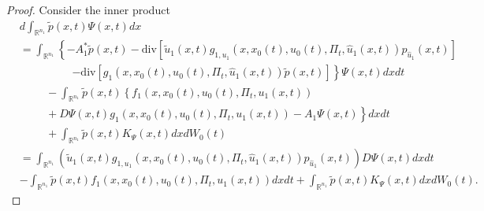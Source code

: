\documentclass[10pt,a4paper]{amsart}
\begin{document}
\begin{proof}
Consider the inner product
    \begin{align*}
        & d\int_{\mathbb{R}^{n_1}}\tilde{p}(x,t)\Psi(x,t)dx \\
        &= \int_{\mathbb{R}^{n_1}} \left\{-A_1^*\tilde{p}(x,t)-\mathrm{div}\left[\tilde{u}_1(x,t)g_{1,u_1}(x,x_0(t),u_0(t),\Pi_t,\hat{u}_1(x,t))p_{\hat{u}_1}(x,t)\right]\right.\\
        &\hspace{2cm} \left. -\mathrm{div}\left[g_1(x,x_0(t),u_0(t),\Pi_t,\hat{u}_1(x,t))\tilde{p}(x,t)\right] \right\}\Psi(x,t)dxdt\\
        &\hspace{1cm} -\int_{\mathbb{R}^{n_1}} \tilde{p}(x,t)\left\{ f_1(x, x_0(t), u_0(t), \Pi_t, u_1(x,t)) \right.\\
        &\hspace{1cm}+\left. D\Psi(x,t)g_1(x,x_0(t),u_0(t),\Pi_t,u_1(x,t)) - A_1 \Psi(x,t) \right\} dxdt \\
        &\hspace{1cm} + \int_{\mathbb{R}^{n_1}} \tilde{p}(x,t)K_\Psi(x,t) dxdW_0(t)\\
        &=\int_{\mathbb{R}^{n_1}} \left( \tilde{u}_1(x,t)g_{1,u_1}(x,x_0(t),u_0(t),\Pi_t,\hat{u}_1(x,t))p_{\hat{u}_1}(x,t) \right)D\Psi(x,t)dxdt\\
        & -\int_{\mathbb{R}^{n_1}}\tilde{p}(x,t) f_1(x, x_0(t), u_0(t), \Pi_t, u_1(x,t)) dxdt+ \int_{\mathbb{R}^{n_1}} \tilde{p}(x,t)K_\Psi(x,t) dxdW_0(t).
    \end{align*}


\end{proof}
\end{document}
